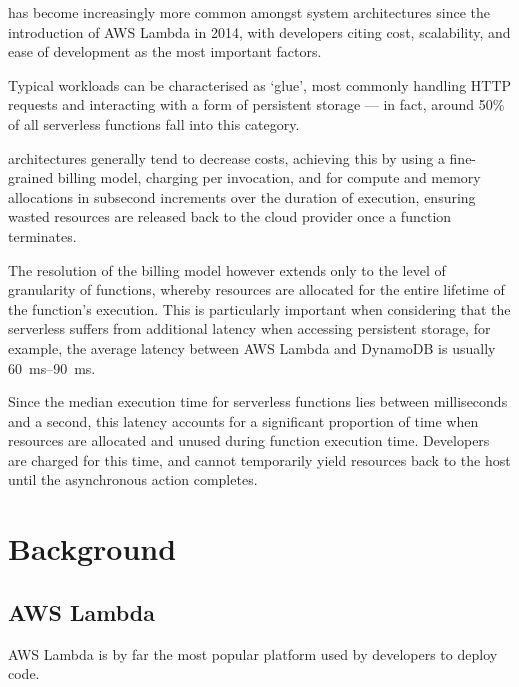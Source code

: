 \documentclass[a4paper,twocolumn]{article}
\begin{document}
\faaslong{} has become increasingly more common amongst system architectures since the introduction of AWS Lambda\cite{aws-lambda} in 2014, with developers citing cost, scalability, and ease of development as the most important factors\cite{review-of-serverless-use-cases-and-characteristics}.

Typical \faas{} workloads can be characterised as `glue', most commonly handling HTTP requests and interacting with a form of persistent storage --- in fact, around 50\% of all serverless functions fall into this category\cite{review-of-serverless-use-cases-and-characteristics}.

\faas{} architectures generally tend to decrease costs, achieving this by using a fine-grained billing model, charging per invocation, and for compute and memory allocations in subsecond increments over the duration of execution, ensuring wasted resources are released back to the cloud provider once a function terminates.

The resolution of the billing model however extends only to the level of granularity of functions, whereby resources are allocated for the entire lifetime of the function's execution. This is particularly important when considering that the serverless suffers from additional latency when accessing persistent storage, for example, the average latency between AWS Lambda and DynamoDB is usually \qtyrange{60}{90}{\ms}\cite{caching-techniques-improve-latency-serverless}.

Since the median execution time for serverless functions lies between milliseconds and a second\cite{review-of-serverless-use-cases-and-characteristics}, this latency accounts for a significant proportion of time when resources are allocated and unused during function execution time. Developers are charged for this time, and cannot temporarily yield resources back to the host until the asynchronous action completes.


\section{Background}

\subsection{AWS Lambda}

AWS Lambda is by far the most popular \faas{} platform used by developers to deploy code.
\end{document}
